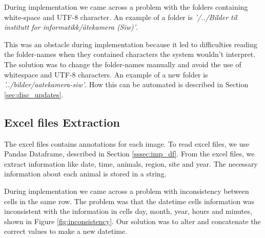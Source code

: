 \documentclass[USenglish]{uit-thesis}
\begin{document}
During implementation we came across a problem with the folders containing white-space and UTF-8 character. An example of a folder is \textit{'/../Bilder til institutt for informatikk/åtekamera (Siw)'}. 

This was an obstacle during implementation because it led to difficulties reading the folder-names when they contained characters the system wouldn't interpret. The solution was to change the folder-names manually and avoid the use of whitespace and UTF-8 characters. An example of a new folder is \textit{'../bilder/aatekamera-siw'}. How this can be automated is described in Section \ref{sec:disc_updates}.





\subsection{Excel files Extraction} \label{ssec:imp_excel}
The excel files contains annotations for each image. To read excel files, we use Pandas Dataframe, described in Section \ref{sssec:imp_df}. From the excel files, we extract information like date, time, animals, region, site and year. The necessary information about each animal is stored in a string.

During implementation we came across a problem with inconsistency between cells in the same row. The problem was that the datetime cells information was inconsistent with the information in cells day, month, year, hours and minutes, shown in Figure \ref{fig:inconsistency}. Our solution was to alter and concatenate the correct values to make a new datetime.
\end{document}
